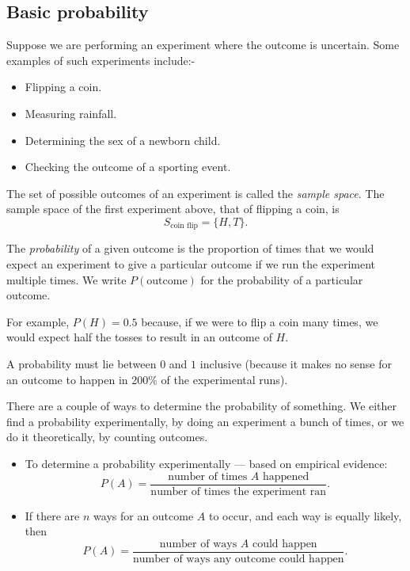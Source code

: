 
\usepackage[normalem]{ulem}
\usepackage{venndiagram}



\renewcommand{\vee}{\text{ or }}
\renewcommand{\wedge}{\text{ and }}

\subsection*{Basic probability}

Suppose we are performing an experiment where the outcome is uncertain. Some examples
of such experiments include:-
\begin{itemize}
  \item Flipping a coin.
  \item Measuring rainfall.
  \item Determining the sex of a newborn child.
  \item Checking the outcome of a sporting event.
\end{itemize}

The set of possible outcomes of an experiment is called the \emph{sample space}. The
sample space of the first experiment above, that of flipping a coin, is
\begin{displaymath}
  S_\text{coin flip} = \{ H, T \}.
\end{displaymath}

The \emph{probability} of a given outcome is the proportion of times that we would expect
an experiment to give a particular outcome if we run the experiment multiple times. We
write $ P(\text{outcome}) $ for the probability of a particular outcome.

For example, $ P(H) = 0.5 $ because, if we were to flip a coin many times, we would expect
half the tosses to result in an outcome of $ H $.

A probability must lie between $ 0 $ and $ 1 $ inclusive (because it makes no sense for an outcome to happen in 200\% of the
experimental runs).

There are a couple of ways to determine the probability of something. We either find a probability experimentally,
by doing an experiment a bunch of times, or we do it theoretically, by counting outcomes.

\begin{itemize}
  \item To determine a probability experimentally --- based on empirical evidence:
        \begin{displaymath}
          P(A) = \frac{\text{number of times $A$ happened}}{\text{number of times the experiment ran}}.
        \end{displaymath}
  \item If there are $ n $ ways for an outcome $ A $ to occur, and each way is equally likely, then
        \begin{displaymath}
          P(A) = \frac{\text{number of ways $A$ could happen}}{\text{number of ways any outcome could happen}}.
        \end{displaymath}
\end{itemize}

